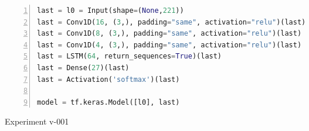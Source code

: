 \noindent
\begin{algorithm}
\begin{lstlisting}[language=Python, frame=single, numbers=left]
last = l0 = Input(shape=(None,221))
last = Conv1D(16, (3,), padding="same", activation="relu")(last)
last = Conv1D(8, (3,), padding="same", activation="relu")(last)
last = Conv1D(4, (3,), padding="same", activation="relu")(last)
last = LSTM(64, return_sequences=True)(last)
last = Dense(27)(last)
last = Activation('softmax')(last)

model = tf.keras.Model([l0], last)
\end{lstlisting}
\caption{\label{alg:v001}Experiment v-001}
\end{algorithm}
